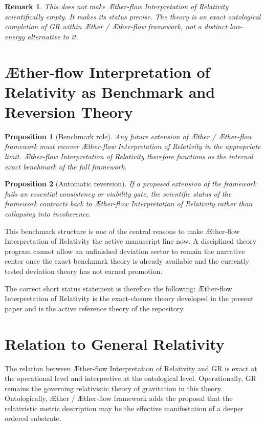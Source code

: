 \documentclass[11pt]{article}
\newcommand{\Aether}{\AE{}ther}
\newcommand{\Aflow}{\AE{}ther-flow}
\newcommand{\TheoryName}{\Aflow{} Interpretation of Relativity}
\newcommand{\TheoryProgram}{\Aether{} / \Aflow{} framework}
\newtheorem{proposition}{Proposition}
\newtheorem{remark}{Remark}
\begin{document}
\begin{remark}
This does not make \TheoryName{} scientifically empty. It makes its status precise. The theory is an exact ontological completion of GR within \TheoryProgram{}, not a distinct low-energy alternative to it.
\end{remark}

\section{\TheoryName{} as Benchmark and Reversion Theory}

\begin{proposition}[Benchmark role]
Any future extension of \TheoryProgram{} must recover \TheoryName{} in the appropriate limit. \TheoryName{} therefore functions as the internal exact benchmark of the full framework.
\end{proposition}

\begin{proposition}[Automatic reversion]
If a proposed extension of the framework fails an essential consistency or viability gate, the scientific status of the framework contracts back to \TheoryName{} rather than collapsing into incoherence.
\end{proposition}

This benchmark structure is one of the central reasons to make \TheoryName{} the active manuscript line now. A disciplined theory program cannot allow an unfinished deviation sector to remain the narrative center once the exact benchmark theory is already available and the currently tested deviation theory has not earned promotion.

The correct short status statement is therefore the following: \TheoryName{} is the exact-closure theory developed in the present paper and is the active reference theory of the repository.

\section{Relation to General Relativity}

The relation between \TheoryName{} and GR is exact at the operational level and interpretive at the ontological level. Operationally, GR remains the governing relativistic theory of gravitation in this theory. Ontologically, \TheoryProgram{} adds the proposal that the relativistic metric description may be the effective manifestation of a deeper ordered substrate.
\end{document}
